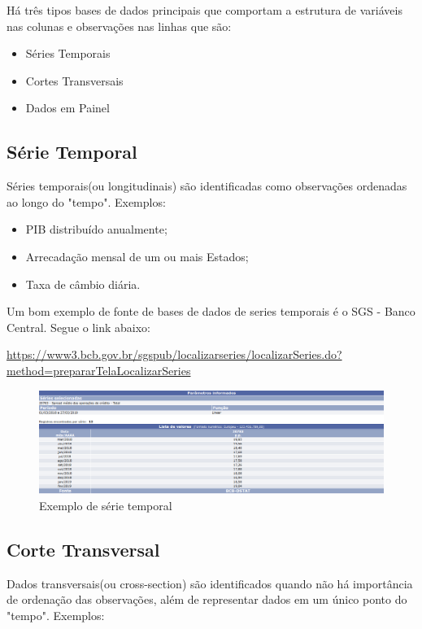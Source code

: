 \documentclass[12pt,a4paper,oneside]{erdc}
\begin{document}
Há três tipos bases de dados principais que comportam a estrutura de variáveis nas colunas e observações nas linhas que são:

\begin{itemize}
	\item Séries Temporais
	\item Cortes Transversais
	\item Dados em Painel
\end{itemize}

\subsection{Série Temporal}

Séries temporais(ou longitudinais) são identificadas como observações ordenadas ao longo do "tempo". Exemplos:
\begin{itemize}
\item PIB distribuído anualmente;
\item Arrecadação mensal de um ou mais Estados;
\item Taxa de câmbio diária.
\end{itemize}

Um bom exemplo de fonte de bases de dados de series temporais é o SGS - Banco Central. Segue o link abaixo:

\url{https://www3.bcb.gov.br/sgspub/localizarseries/localizarSeries.do?method=prepararTelaLocalizarSeries}


\begin{figure}[htpb]
	\centering
	\includegraphics[width=\linewidth]{../figs/BP_Curso_TecComp_00_2019_f03-02}
	\caption{Exemplo de série temporal}
	\label{fig:f03-02}
\end{figure}

\subsection{Corte Transversal}

Dados transversais(ou cross-section) são identificados quando não há importância de ordenação das observações, além de representar dados em um único ponto do "tempo". Exemplos:
\end{document}
